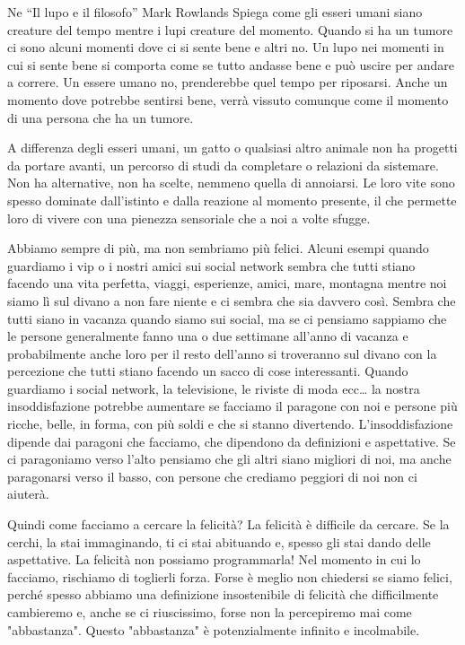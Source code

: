 \documentclass[12pt]{book} %
\begin{document}
\begin{mdframed}[linewidth=1pt]
Ne “Il lupo e il filosofo” Mark
Rowlands Spiega come gli esseri umani siano creature del tempo mentre i lupi creature del momento. Quando si ha un
tumore ci sono alcuni momenti dove ci si sente bene e altri no. Un lupo nei momenti in cui si sente bene si comporta
come se tutto andasse bene e può uscire per andare a correre. Un essere umano no, prenderebbe quel tempo per riposarsi.
Anche un momento dove potrebbe sentirsi bene, verrà vissuto comunque come il momento di una persona che ha un tumore.

A differenza degli esseri umani, un gatto o qualsiasi altro animale non ha progetti da portare avanti, un percorso di studi da completare o relazioni da sistemare. Non ha alternative, non ha scelte, nemmeno quella di annoiarsi. Le loro vite sono spesso dominate dall'istinto e dalla reazione al momento presente, il che permette loro di vivere con una pienezza sensoriale che a noi a volte sfugge. 
\end{mdframed}

Abbiamo sempre di più, ma non sembriamo più felici. Alcuni esempi quando guardiamo i vip o i nostri amici sui
social network sembra che tutti stiano facendo una vita perfetta, viaggi, esperienze, amici, mare, montagna mentre noi
siamo lì sul divano a non fare niente e ci sembra che sia davvero così. Sembra che tutti siano in vacanza quando siamo sui social, ma se
ci pensiamo sappiamo che le persone generalmente fanno una o due settimane all'anno di vacanza e
probabilmente anche loro per il resto dell'anno si troveranno sul divano con la percezione che
tutti stiano facendo un sacco di cose interessanti. Quando guardiamo i social network, la
televisione, le riviste di moda ecc… la nostra insoddisfazione potrebbe aumentare se facciamo il paragone con noi e persone
più ricche, belle, in forma, con più soldi e che si stanno divertendo. L'insoddisfazione dipende dai paragoni che
facciamo, che dipendono da definizioni e aspettative. Se ci paragoniamo verso l'alto pensiamo che gli altri siano
migliori di noi, ma anche paragonarsi verso il basso, con persone che crediamo peggiori di noi non ci aiuterà.

Quindi come facciamo a cercare la felicità? 
La felicità è difficile da cercare. Se la cerchi, la stai immaginando, ti ci stai abituando e, spesso gli stai dando delle aspettative. La felicità non possiamo programmarla! Nel momento in cui lo facciamo, rischiamo di toglierli forza. Forse è meglio non chiedersi se siamo felici, perché spesso abbiamo una definizione insostenibile di felicità che difficilmente cambieremo e, anche se ci riuscissimo, forse non la percepiremo mai come "abbastanza". Questo "abbastanza" è potenzialmente infinito e incolmabile. 
\end{document}
